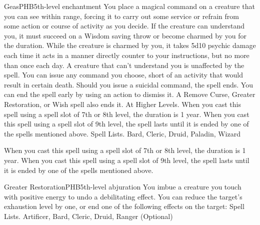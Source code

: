 \begin{spell}{Geas}{PHB}{5th-level enchantment}
{
}
You place a magical command on a creature that you can see within range, forcing it to carry out some service or refrain from some action or course of activity as you decide.
If the creature can understand you, it must succeed on a Wisdom saving throw or become charmed by you for the duration. While the creature is charmed by you, it takes 5d10 psychic damage each time it acts in a manner directly counter to your instructions, but no more than once each day. A creature that can’t understand you is unaffected by the spell.
You can issue any command you choose, short of an activity that would result in certain death. Should you issue a suicidal command, the spell ends. You can end the spell early by using an action to dismiss it. A Remove Curse, Greater Restoration, or Wish spell also ends it.
At Higher Levels. When you cast this spell using a spell slot of 7th or 8th level, the duration is 1 year. When you cast this spell using a spell slot of 9th level, the spell lasts until it is ended by one of the spells mentioned above.
Spell Lists. Bard, Cleric, Druid, Paladin, Wizard

 When you cast this spell using a spell slot of 7th or 8th level, the duration is 1 year. When you cast this spell using a spell slot of 9th level, the spell lasts until it is ended by one of the spells mentioned above.
\end{spell}

\begin{spell}{Greater Restoration}{PHB}{5th-level abjuration}
{
}
You imbue a creature you touch with positive energy to undo a debilitating effect. You can reduce the target’s exhaustion level by one, or end one of the following effects on the target:
Spell Lists. Artificer, Bard, Cleric, Druid, Ranger (Optional)
\end{spell}

